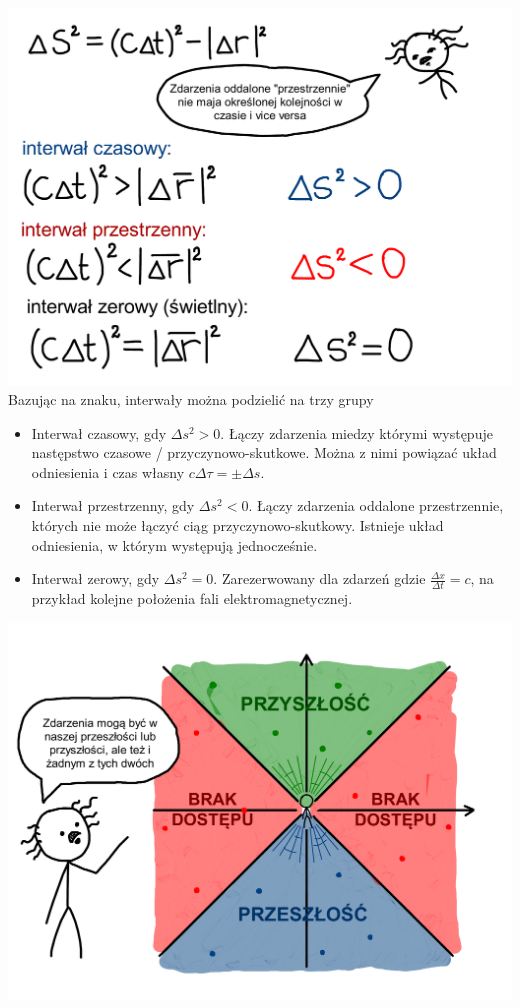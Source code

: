 \documentclass[10pt,twocolumn,fleqn,polish]{article}
\begin{document}
\noindent\includegraphics[width=1\linewidth]{pages/STA-page32}
Bazując na znaku, interwały można podzielić na trzy grupy
\begin{itemize}
  \item Interwał czasowy, gdy $\Delta s^2 > 0$.
        Łączy zdarzenia miedzy którymi występuje następstwo czasowe / przyczynowo-skutkowe.
        Można z nimi powiązać układ odniesienia i czas własny $c\Delta \tau = \pm\Delta s$.
  \item Interwał przestrzenny, gdy $\Delta s^2 < 0$.
        Łączy zdarzenia oddalone przestrzennie, których nie może łączyć ciąg przyczynowo-skutkowy.
        Istnieje układ odniesienia, w którym występują jednocześnie.
  \item Interwał zerowy, gdy $\Delta s^2 = 0$. Zarezerwowany dla zdarzeń gdzie
        $\frac{\Delta x}{\Delta t} = c$, na przykład kolejne położenia fali
        elektromagnetycznej.
\end{itemize}
\newpage

\noindent\includegraphics[width=1\linewidth]{pages/STA-page34}
\end{document}
